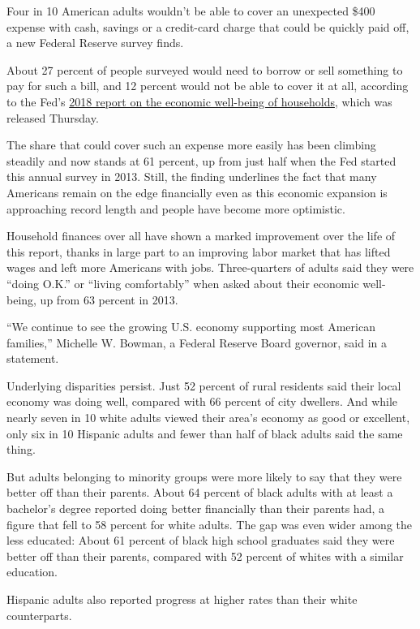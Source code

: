 Four in 10 American adults wouldn't be able to cover an unexpected \$400
expense with cash, savings or a credit-card charge that could be quickly
paid off, a new Federal Reserve survey finds.

About 27 percent of people surveyed would need to borrow or sell
something to pay for such a bill, and 12 percent would not be able to
cover it at all, according to the Fed's
\href{https://www.federalreserve.gov/publications/files/2018-report-economic-well-being-us-households-201905.pdf}{2018
report on the economic well-being of households}, which was released
Thursday.

The share that could cover such an expense more easily has been climbing
steadily and now stands at 61 percent, up from just half when the Fed
started this annual survey in 2013. Still, the finding underlines the
fact that many Americans remain on the edge financially even as this
economic expansion is approaching record length and people have become
more optimistic.

Household finances over all have shown a marked improvement over the
life of this report, thanks in large part to an improving labor market
that has lifted wages and left more Americans with jobs. Three-quarters
of adults said they were ``doing O.K.'' or ``living comfortably'' when
asked about their economic well-being, up from 63 percent in 2013.

``We continue to see the growing U.S. economy supporting most American
families,'' Michelle W. Bowman, a Federal Reserve Board governor, said
in a statement.

Underlying disparities persist. Just 52 percent of rural residents said
their local economy was doing well, compared with 66 percent of city
dwellers. And while nearly seven in 10 white adults viewed their area's
economy as good or excellent, only six in 10 Hispanic adults and fewer
than half of black adults said the same thing.

But adults belonging to minority groups were more likely to say that
they were better off than their parents. About 64 percent of black
adults with at least a bachelor's degree reported doing better
financially than their parents had, a figure that fell to 58 percent for
white adults. The gap was even wider among the less educated: About 61
percent of black high school graduates said they were better off than
their parents, compared with 52 percent of whites with a similar
education.

Hispanic adults also reported progress at higher rates than their white
counterparts.

